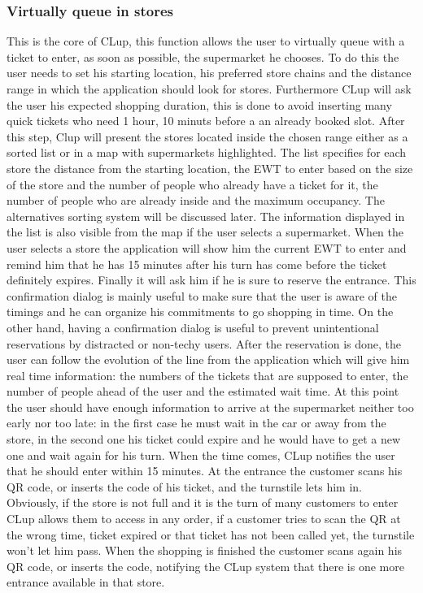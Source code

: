 \subsubsection{Virtually queue in stores}
This is the core of CLup, this function allows the user to virtually queue with a ticket to enter, as soon as possible, the supermarket he chooses. To do this the user needs to set his starting location, his preferred store chains and the distance range in which the application should look for stores. Furthermore CLup will ask the user his expected shopping duration, this is done to avoid inserting many quick tickets who need 1 hour, 10 minuts before a an already booked slot. After this step, Clup will present the stores located inside the chosen range either as a sorted list or in a map with supermarkets highlighted. The list specifies for each store the distance from the starting location, the EWT to enter based on the size of the store and the number of people who already have a ticket for it, the number of people who are already inside and the maximum occupancy. The alternatives sorting system will be discussed later. The information displayed in the list is also visible from the map if the user selects a supermarket. When the user selects a store the application will show him the current EWT to enter and remind him that he has 15 minutes after his turn has come before the ticket definitely expires. Finally it will ask him if he is sure to reserve the entrance. This confirmation dialog is mainly useful to make sure that the user is aware of the timings and he can organize his commitments to go shopping in time. On the other hand, having a confirmation dialog is useful to prevent unintentional reservations by distracted or non-techy users. After the reservation is done, the user can follow the evolution of the line from the application which will give him real time information: the numbers of the tickets that are supposed to enter, the number of people ahead of the user and the estimated wait time. At this point the user should have enough information to arrive at the supermarket neither too early nor too late: in the first case he must wait in the car or away from the store, in the second one his ticket could expire and he would have to get a new one and wait again for his turn. When the time comes, CLup notifies the user that he should enter within 15 minutes. At the entrance the customer scans his QR code, or inserts the code of his ticket, and the turnstile lets him in. Obviously, if the store is not full and it is the turn of many customers to enter CLup allows them to access in any order, if a customer tries to scan the QR at the wrong time, ticket expired or that ticket has not been called yet, the turnstile won’t let him pass. When the shopping is finished the customer scans again his QR code, or inserts the code, notifying the CLup system that there is one more entrance available in that store.
